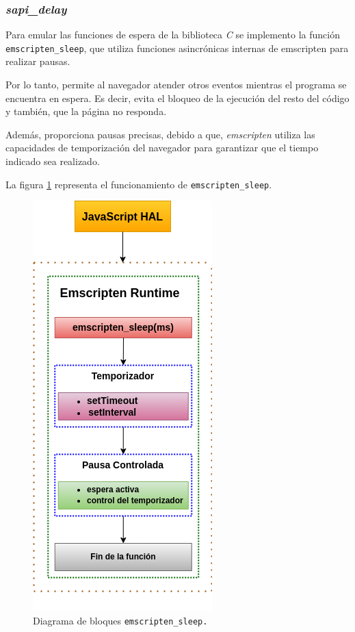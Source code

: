 \subsubsection{\textit{\textbf{sapi\_delay}}}

Para emular las funciones de espera de la biblioteca \textit{C} se implemento la función \texttt{emscripten\_sleep}, que utiliza funciones asincrónicas internas de emscripten para realizar pausas. 

Por lo tanto, permite al navegador atender otros eventos mientras el programa se encuentra en espera. Es decir, evita el bloqueo de la ejecución del resto del código y también, que la página no responda.

Además, proporciona pausas precisas, debido a que, \textit{emscripten}  utiliza las capacidades de temporización del navegador para garantizar que el tiempo indicado sea realizado.

La figura \ref{fig:emscriptenDelay} representa el funcionamiento de  \texttt{emscripten\_sleep}. 

\begin{figure}[ht]
	\centering
	\includegraphics[scale=.53]{./Figures/emscriptenDelay.png}
	\caption{Diagrama de bloques \texttt{emscripten\_sleep.}}
	\label{fig:emscriptenDelay}
\end{figure}

